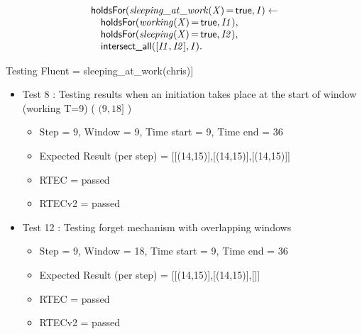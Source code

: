 \documentclass[8pt]{beamer}
\DeclareMathOperator{\val}{=}  %
\def \patsize {}
\def\holdsFor{\textsf{\patsize holdsFor}}
\def\intersectall{\textsf{\patsize intersect\_all}}
\def\true{\textsf{\patsize true}}
\newenvironment{mysplit}%
  {\arraycolsep 0pt \begin{array}{l}}%
  {\end{array}}
\begin{document}
\begin{frame}
\begin{minipage}{0.48\linewidth}
        \begin{align*}
            \begin{mysplit}
                \holdsFor\mathit{(sleeping\_at\_work(X)\val\true,I) \leftarrow}\\
                \quad    \holdsFor\mathit{(working(X)\val\true,I1),}\\
                \quad    \holdsFor\mathit{(sleeping(X)\val\true,I2),}\\
                \quad    \intersectall\mathit{([I1,I2],I).}
            \end{mysplit}
        \end{align*}
    \end{minipage}
    Testing Fluent = sleeping\_at\_work(chris)]\\
    \begin{itemize}
        \item Test 8 : Testing results when an initiation takes place at the start of window (working T=9) ( $(9,18]$ )
            \begin{itemize}
                \item Step = 9, Window = 9, Time start = 9, Time end = 36
                \item Expected Result (per step) = [[(14,15)],[(14,15)],[(14,15)]]
                \item RTEC = passed
                \item RTECv2 = passed
            \end{itemize}
        \item Test 12 : Testing forget mechanism with overlapping windows
            \begin{itemize}
                \item Step = 9, Window = 18, Time start = 9, Time end = 36
                \item Expected Result (per step) = [[(14,15)],[(14,15)],[]]
                \item RTEC = passed
                \item RTECv2 = passed
            \end{itemize}
    \end{itemize}
\end{frame}
\end{document}
